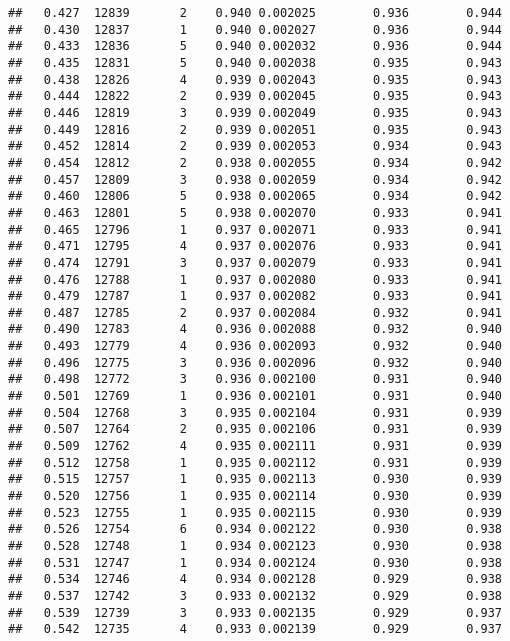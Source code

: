 \documentclass[
]{book}
\begin{document}
\begin{verbatim}
##   0.427  12839       2    0.940 0.002025        0.936        0.944
##   0.430  12837       1    0.940 0.002027        0.936        0.944
##   0.433  12836       5    0.940 0.002032        0.936        0.944
##   0.435  12831       5    0.940 0.002038        0.935        0.943
##   0.438  12826       4    0.939 0.002043        0.935        0.943
##   0.444  12822       2    0.939 0.002045        0.935        0.943
##   0.446  12819       3    0.939 0.002049        0.935        0.943
##   0.449  12816       2    0.939 0.002051        0.935        0.943
##   0.452  12814       2    0.939 0.002053        0.934        0.943
##   0.454  12812       2    0.938 0.002055        0.934        0.942
##   0.457  12809       3    0.938 0.002059        0.934        0.942
##   0.460  12806       5    0.938 0.002065        0.934        0.942
##   0.463  12801       5    0.938 0.002070        0.933        0.941
##   0.465  12796       1    0.937 0.002071        0.933        0.941
##   0.471  12795       4    0.937 0.002076        0.933        0.941
##   0.474  12791       3    0.937 0.002079        0.933        0.941
##   0.476  12788       1    0.937 0.002080        0.933        0.941
##   0.479  12787       1    0.937 0.002082        0.933        0.941
##   0.487  12785       2    0.937 0.002084        0.932        0.941
##   0.490  12783       4    0.936 0.002088        0.932        0.940
##   0.493  12779       4    0.936 0.002093        0.932        0.940
##   0.496  12775       3    0.936 0.002096        0.932        0.940
##   0.498  12772       3    0.936 0.002100        0.931        0.940
##   0.501  12769       1    0.936 0.002101        0.931        0.940
##   0.504  12768       3    0.935 0.002104        0.931        0.939
##   0.507  12764       2    0.935 0.002106        0.931        0.939
##   0.509  12762       4    0.935 0.002111        0.931        0.939
##   0.512  12758       1    0.935 0.002112        0.931        0.939
##   0.515  12757       1    0.935 0.002113        0.930        0.939
##   0.520  12756       1    0.935 0.002114        0.930        0.939
##   0.523  12755       1    0.935 0.002115        0.930        0.939
##   0.526  12754       6    0.934 0.002122        0.930        0.938
##   0.528  12748       1    0.934 0.002123        0.930        0.938
##   0.531  12747       1    0.934 0.002124        0.930        0.938
##   0.534  12746       4    0.934 0.002128        0.929        0.938
##   0.537  12742       3    0.933 0.002132        0.929        0.938
##   0.539  12739       3    0.933 0.002135        0.929        0.937
##   0.542  12735       4    0.933 0.002139        0.929        0.937

\end{verbatim}
\end{document}
